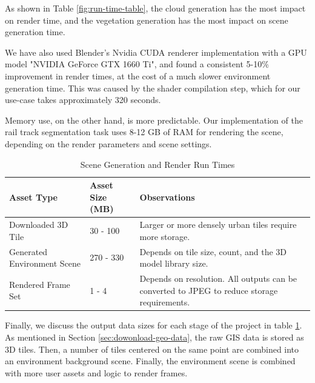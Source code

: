 As shown in Table \ref{fig:run-time-table}, the cloud generation has the most impact on render time, and the vegetation generation has the most impact on scene generation time.

We have also used Blender's Nvidia CUDA renderer implementation with a GPU model "NVIDIA GeForce GTX 1660 Ti", and found a consistent 5-10\% improvement in render times, at the cost of a much slower environment generation time. This was caused by the shader compilation step, which for our use-case takes approximately 320 seconds.

Memory use, on the other hand, is more predictable. Our implementation of the rail track segmentation task uses 8-12 GB of RAM for rendering the scene, depending on the render parameters and scene settings.

\begin{table}[H]
\centering
\begin{tabular}{|p{4.5cm}|p{2.5cm}|p{7cm}|}
\hline
    Asset Type & Asset Size (MB) & Observations \\
\hline
    Downloaded 3D Tile & 30 - 100 & Larger or more densely urban tiles require more storage. \\
\hline
    Generated Environment Scene & 270 - 330 & Depends on tile size, count, and the 3D model library size. \\
\hline
    Rendered Frame Set & 1 - 4 & Depends on resolution. All outputs can be converted to JPEG to reduce storage requirements.  \\
\hline
\end{tabular}
\caption{Scene Generation and Render Run Times}
\label{fig:output-data-sizee}
\end{table}

Finally, we discuss the output data sizes for each stage of the project in table \ref{fig:output-data-sizee}. As mentioned in Section \ref{sec:dowonload-geo-data}, the raw GIS data is stored as 3D tiles. Then, a number of tiles centered on the same point are combined into an environment background scene. Finally, the environment scene is combined with more user assets and logic to render frames. 

